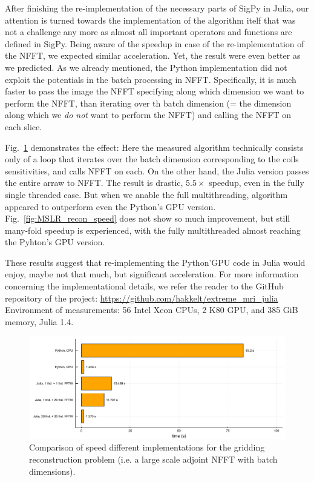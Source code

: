 After finishing the re-implementation of the necessary parts of SigPy in Julia, our attention is turned towards the implementation of the algorithm itelf that was not a challenge any more as almost all important operators and functions are defined in SigPy. Being aware of the speedup in case of the re-implementation of the NFFT, we expected similar acceleration. Yet, the result were even better as we predicted. As we already mentioned, the Python implementation did not exploit the potentials in the batch processing in NFFT. Specifically, it is much faster to pass the image the NFFT specifying along which dimension we want to perform the NFFT, than iterating over th batch dimension (= the dimension along which we \textit{do not} want to perform the NFFT) and calling the NFFT on each slice. 

Fig.~\ref{fig:gridding_recon_speed} demonstrates the effect: Here the measured algorithm technically consists only of a loop that iterates over the batch dimension corresponding to the coils sensitivities, and calls NFFT on each. On the other hand, the Julia version passes the entire arraw to NFFT. The result is drastic, $5.5\times$ speedup, even in the fully single threaded case. But when we anable the full multithreading, algorithm appeared to outperform even the Python's GPU version. Fig.~\ref{fig:MSLR_recon_speed} does not show so much improvement, but still many-fold speedup is experienced, with the fully multithreaded almost reaching the Pyhton's GPU version.

These results suggest that re-implementing the Python'GPU code in Julia would enjoy, maybe not that much, but significant acceleration. For more information concerning the implementational details, we refer the reader to the GitHub repository of the project: \url{https://github.com/hakkelt/extreme_mri_julia} Environment of measurements: 56 Intel Xeon CPUs, 2 K80 GPU, and 385 GiB memory, Julia 1.4.

\begin{figure}
    \centering
    \includegraphics[width=\linewidth]{images/gridding_recon_speed.pdf}
    \caption{Comparison of speed different implementations for the gridding reconstruction problem (i.e. a large scale adjoint NFFT with batch dimensions).}
    \label{fig:gridding_recon_speed}
\end{figure}

